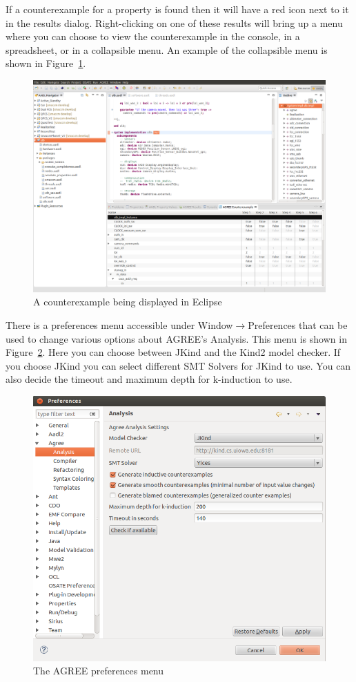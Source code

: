 \documentclass{llncs}
\begin{document}
If a counterexample for a property is found then it will have a red icon next to it in the results dialog.  Right-clicking on one of these results will bring up a menu where you can choose to view the counterexample in the console, in a spreadsheet, or in a collapsible menu.  An example of the collapsible menu is shown in Figure~\ref{fig:collapse}.

\begin{figure}
\includegraphics[scale=0.225]{analysis2.png}
\caption{A counterexample being displayed in Eclipse}
\label{fig:collapse}
\end{figure}

There is a preferences menu accessible under Window$\rightarrow$Preferences that can be used to change various options about AGREE's Analysis. This menu is shown in Figure~\ref{fig:prefs}.  Here you can choose between JKind and the Kind2 model checker.  If you choose JKind you can select different SMT Solvers for JKind to use.  You can also decide the timeout and maximum depth for k-induction to use.

\begin{figure}
\includegraphics[scale=0.45]{analysis3.png}
\caption{The AGREE preferences menu}
\label{fig:prefs}
\end{figure}
\end{document}
